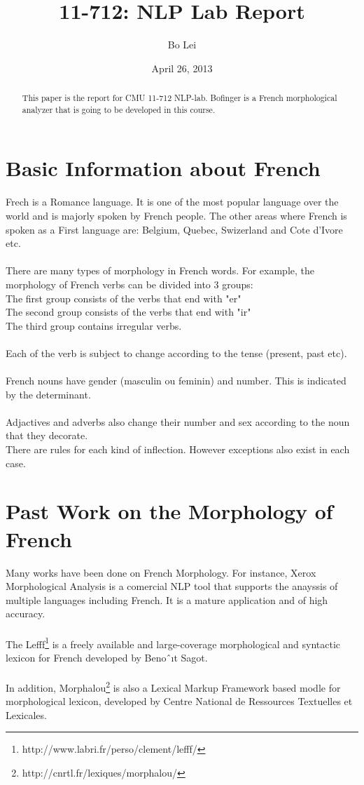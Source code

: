 \documentclass[11pt,letterpaper]{article}
\title{11-712:  NLP Lab Report}
\author{Bo Lei}
\date{April 26, 2013}
\begin{document}
\maketitle
\begin{abstract}
This paper is the report for CMU 11-712 NLP-lab. Bofinger is a French morphological analyzer that is going to be developed in this course.
\end{abstract}


\section{Basic Information about French}

Frech is a Romance language. It is one of the most popular language over the world and is majorly spoken by French people. The other areas where French is spoken as a First language are: Belgium, Quebec, Swizerland and Cote d'Ivore etc.\\
\\
There are many types of morphology in French words. For example, the morphology of French verbs can be divided into 3 groups:\\

\indent\indent The first group consists of the verbs that end with "er"\\
\indent\indent The second group consists of the verbs that end with "ir"\\
\indent\indent The third group contains irregular verbs.\\
\\
Each of the verb is subject to change according to the tense (present, past etc).\\
\\
French nouns have gender (masculin ou feminin) and number. This is indicated by the determinant. \\
\\
Adjactives and adverbs also change their number and sex according to the noun that they decorate.
\\
There are rules for each kind of inflection. However exceptions also exist in each case.


\section{Past Work on the Morphology of French}
Many works have been done on French Morphology. For instance, Xerox Morphological Analysis is a comercial NLP tool that supports the anayssis of multiple languages including French. It is a mature application and of high accuracy.\\
\\
The Lefff\footnote{http://www.labri.fr/perso/clement/lefff/} is a freely available and large-coverage morphological and syntactic lexicon for French developed by Benoˆıt Sagot. \\
\\
In addition, Morphalou\footnote{http://cnrtl.fr/lexiques/morphalou/} is also a Lexical Markup Framework based modle for morphological lexicon, developed by Centre National de Ressources Textuelles et Lexicales. 
\end{document}
